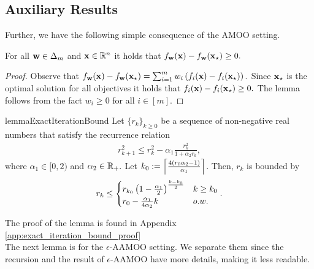 \subsection{Auxiliary Results}

Further, we have the following simple consequence of the AMOO setting.
\begin{lemma}\label{lemma:optimality_of_x_star}
For all ${\mathbf{w}}\in \Delta_m$ and ${\mathbf{x}}\in \mathbb{R}^n$ it holds that $f_{\mathbf{w}}({\mathbf{x}}) - f_{\mathbf{w}}({\mathbf{x}}_\star)\geq 0.$
\end{lemma}
\begin{proof}

    Observe that
    $
        f_{\mathbf{w}}({\mathbf{x}}) - f_{\mathbf{w}}({\mathbf{x}}_\star)= \sum_{i=1}^m w_i \left(f_i({\mathbf{x}}) - f_i({\mathbf{x}}_\star)\right).
    $
    Since ${\mathbf{x}}_\star$ is the optimal solution for all objectives it holds that $f_i({\mathbf{x}}) - f_i({\mathbf{x}}_\star) \geq  0.$ The lemma follows from the fact $w_i\geq 0$ for all $i\in [m].$
\end{proof}

\begin{restatable}{lemma}{ExactIterationBound}
\label{lemma:exact_iteration_bound}
Let $\{ r_k\}_{k\geq 0}$ be a sequence of non-negative real numbers that satisfy the recurrence relation
\begin{align*}
    r_{k+1}^2 \leq r_k^2 -\alpha_1\frac{r_k^2}{1+ \alpha_2 r_k},
\end{align*}
where $\alpha_1\in [0,2)$ and $\alpha_2\in \mathbb{R}_+.$ Let $k_0 := \Big\lceil \frac{4 \left(r_0 \alpha_2 - 1\right)}{ \alpha_1} \Big\rceil$. Then, $r_k$ is bounded by
    \begin{align*}
        r_k \leq 
        \begin{cases}
            r_{k_0} \left(1-\frac{\alpha_1}{2}\right)^\frac{k-k_0}{2} & k\geq k_0\\
            r_0 - \frac{ \alpha_1}{4\alpha_2}k & o.w.
        \end{cases}.
    \end{align*}
\end{restatable}
The proof of the lemma is found in Appendix \ref{app:exact_iteration_bound_proof}\\
The next lemma is for the $\epsilon$-AAMOO setting. We separate them since the recursion and the result of $\epsilon$-AAMOO have more details, making it less readable.


